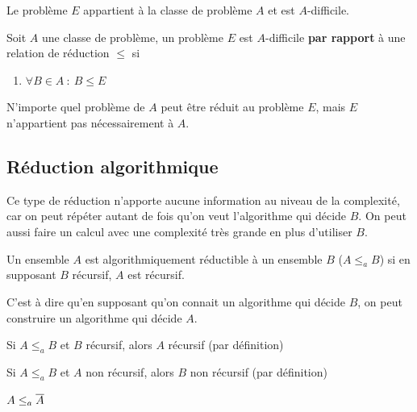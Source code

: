 \begin{myrem}
	Le problème $E$ appartient à la classe de problème $A$ et
	est $A$-difficile.
\end{myrem}

\begin{mydef}[$A$-difficile]
	Soit $A$ une classe de problème, un problème $E$ est $A$-difficile
	\textbf{par rapport} à une relation de réduction $\leq$ si
	\begin{enumerate}
		\item $\forall B \in A \ : \ B \leq E$
	\end{enumerate}
\end{mydef}

\begin{myrem}
	N'importe quel problème de $A$ peut être réduit au problème $E$, mais $E$
	n'appartient pas nécessairement à $A$.
\end{myrem}


\subsection{Réduction algorithmique}
Ce type de réduction n'apporte aucune information au niveau de la complexité, car on
peut répéter autant de fois qu'on veut l'algorithme qui décide $B$. On peut aussi
faire un calcul avec une complexité très grande en plus d'utiliser $B$.

\begin{mydef}
	Un ensemble $A$ est algorithmiquement réductible à un ensemble $B$
	($A\leq_a B$) si en supposant $B$ récursif, $A$ est récursif.
\end{mydef}

\begin{myrem}
	C'est à dire qu'en supposant qu'on connait un algorithme qui décide $B$, on
	peut construire un algorithme qui décide $A$.
\end{myrem}

\begin{myprop}
	Si $A \leq_a B$ et $B$ récursif, alors $A$ récursif (par définition)
\end{myprop}

\begin{myprop}
	Si $A \leq_a B$ et $A$ non récursif, alors $B$ non récursif (par définition)
\end{myprop}

\begin{myprop}
	$A \leq_a \overline{A}$
\end{myprop}

